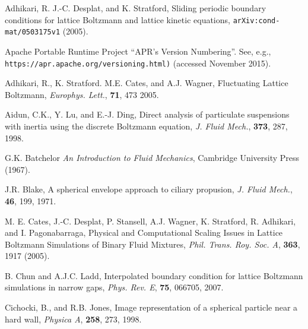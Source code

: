 %
%
%
%
%
%

\vfill
\pagebreak



\begin{thebibliography}{99}


Adhikari, R. J.-C. Desplat, and K. Stratford,
Sliding periodic boundary conditions for lattice Boltzmann and lattice
kinetic equations,
\texttt{arXiv:cond-mat/0503175v1} (2005).

Apache Portable Runtime Project ``APR's Version Numbering''.
See, e.g., \texttt{https://apr.apache.org/versioning.html)}
(accessed November 2015).

Adhikari, R., K. Stratford. M.E. Cates, and A.J. Wagner,
Fluctuating Lattice Boltzmann,
\textit{Europhys. Lett.}, \textbf{71}, 473 2005.

Aidun, C.K., Y. Lu, and E.-J. Ding,
Direct analysis of particulate suspensions with inertia using the
discrete Boltzmann equation,
\textit{J. Fluid Mech.}, \textbf{373}, 287, 1998.

G.K. Batchelor
\textit{An Introduction to Fluid Mechanics},
Cambridge University Press (1967).

J.R. Blake, A spherical envelope approach to ciliary propusion,
\textit{J. Fluid Mech.}, \textbf{46}, 199, 1971.

M. E. Cates, J.-C. Desplat, P. Stansell, A.J. Wagner, K. Stratford,
R. Adhikari, and I. Pagonabarraga,
Physical and Computational Scaling Issues in Lattice Boltzmann
Simulations of Binary Fluid Mixtures,
\textit{Phil. Trans. Roy. Soc. A}, \textbf{363}, 1917 (2005). 

B. Chun and A.J.C. Ladd,
Interpolated boundary condition for lattice Boltzmann simulations in
narrow gaps,
\textit{Phys. Rev. E}, \textbf{75}, 066705, 2007.

Cichocki, B., and R.B. Jones,
Image representation of a spherical particle near a hard wall,
\textit{Physica A}, \textbf{258}, 273, 1998.


\end{thebibliography}
